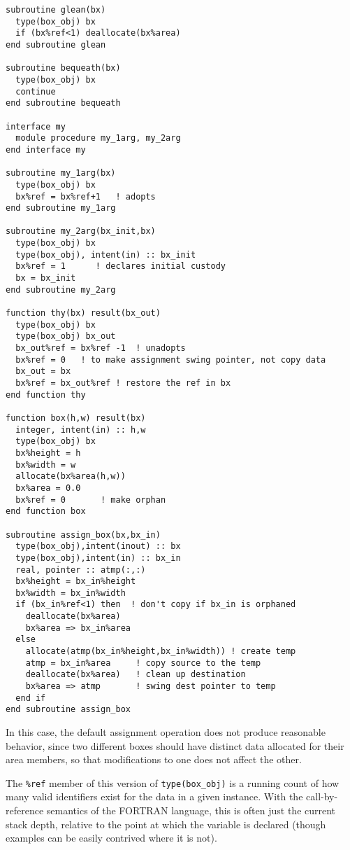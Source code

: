 \begin{verbatim}
subroutine glean(bx)
  type(box_obj) bx
  if (bx%ref<1) deallocate(bx%area)
end subroutine glean

subroutine bequeath(bx)
  type(box_obj) bx
  continue
end subroutine bequeath

interface my
  module procedure my_1arg, my_2arg
end interface my

subroutine my_1arg(bx)
  type(box_obj) bx
  bx%ref = bx%ref+1   ! adopts
end subroutine my_1arg

subroutine my_2arg(bx_init,bx)
  type(box_obj) bx
  type(box_obj), intent(in) :: bx_init
  bx%ref = 1      ! declares initial custody
  bx = bx_init
end subroutine my_2arg

function thy(bx) result(bx_out)
  type(box_obj) bx
  type(box_obj) bx_out
  bx_out%ref = bx%ref -1  ! unadopts
  bx%ref = 0   ! to make assignment swing pointer, not copy data
  bx_out = bx
  bx%ref = bx_out%ref ! restore the ref in bx
end function thy

function box(h,w) result(bx)
  integer, intent(in) :: h,w
  type(box_obj) bx
  bx%height = h
  bx%width = w
  allocate(bx%area(h,w))
  bx%area = 0.0
  bx%ref = 0       ! make orphan
end function box

subroutine assign_box(bx,bx_in)
  type(box_obj),intent(inout) :: bx
  type(box_obj),intent(in) :: bx_in
  real, pointer :: atmp(:,:)
  bx%height = bx_in%height
  bx%width = bx_in%width
  if (bx_in%ref<1) then  ! don't copy if bx_in is orphaned
    deallocate(bx%area)
    bx%area => bx_in%area
  else
    allocate(atmp(bx_in%height,bx_in%width)) ! create temp
    atmp = bx_in%area     ! copy source to the temp
    deallocate(bx%area)   ! clean up destination
    bx%area => atmp       ! swing dest pointer to temp
  end if
end subroutine assign_box

\end{verbatim}

In this case, the default assignment operation does not produce
reasonable behavior, since two different boxes should have distinct
data allocated for their area members, so that modifications to
one does not affect the other.

The \verb+%ref+ member of this version of \verb+type(box_obj)+ is a
running count of how many valid identifiers exist for the data in a
given instance.  With the call-by-reference semantics of the FORTRAN
language, this is often just the current stack depth, relative to
the point at which the variable is declared (though examples can
be easily contrived where it is not).

